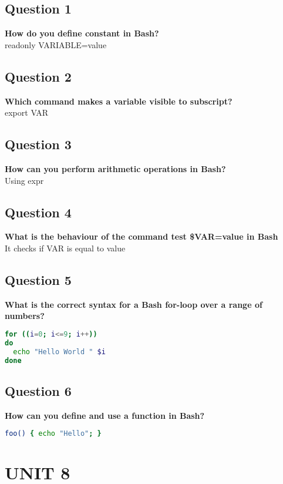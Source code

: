 \documentclass[11pt,parskip]{scrartcl}
\begin{document}
\subsection*{Question 1}
\textbf{How do you define constant in Bash?} \\
readonly VARIABLE=value

\subsection*{Question 2}
\textbf{Which command makes a variable visible to subscript?} \\
export VAR

\subsection*{Question 3}
\textbf{How can you perform arithmetic operations in Bash?} \\
Using expr

\subsection*{Question 4}
\textbf{What is the behaviour of the command test \$VAR=value in Bash} \\
It checks if VAR is equal to value

\subsection*{Question 5}
\textbf{What is the correct syntax for a Bash for-loop over a range of numbers?} \\

\begin{lstlisting}[language=bash]
for ((i=0; i<=9; i++))
do
  echo "Hello World " $i
done
\end{lstlisting}

\subsection*{Question 6}
\textbf{How can you define and use a function in Bash?} \\
\begin{lstlisting}[language=bash]
foo() { echo "Hello"; }
\end{lstlisting}

\section*{UNIT 8}
\end{document}
